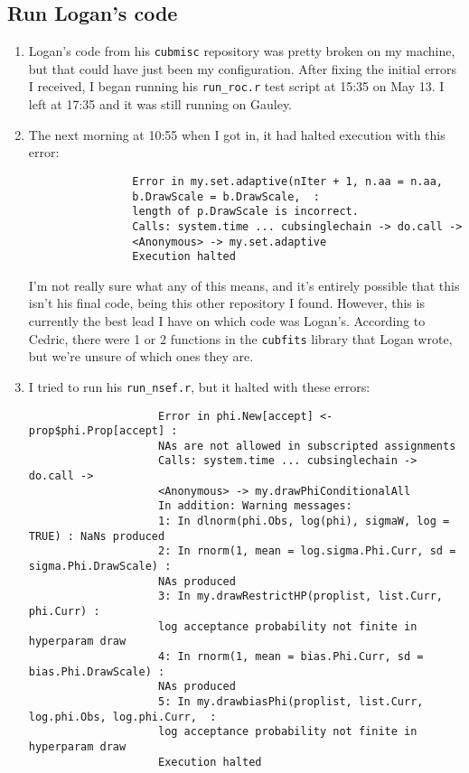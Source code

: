 \documentclass[12 pt]{article}
\begin{document}
		\subsection{Run Logan's code}
			\begin{enumerate}
				\item Logan's code from his \texttt{cubmisc} repository was pretty broken on my machine, but that could have just been my configuration. After fixing the initial errors I received, I began running his \texttt{run\_roc.r} test script at 15:35 on May 13. I left at 17:35 and it was still running on Gauley.
				\item The next morning at 10:55 when I got in, it had halted execution with this error:
				\begin{verbatim}
				Error in my.set.adaptive(nIter + 1, n.aa = n.aa, 
				b.DrawScale = b.DrawScale,  : 
				length of p.DrawScale is incorrect.
				Calls: system.time ... cubsinglechain -> do.call -> 
				<Anonymous> -> my.set.adaptive
				Execution halted
				\end{verbatim}
				
				I'm not really sure what any of this means, and it's entirely possible that this isn't his final code, being this other repository I found. However, this is currently the best lead I have on which code was Logan's. According to Cedric, there were 1 or 2 functions in the \texttt{cubfits} library that Logan wrote, but we're unsure of which ones they are.
				
				\item I tried to run his \texttt{run\_nsef.r}, but it halted with these errors:
				\begin{verbatim}
					Error in phi.New[accept] <- prop$phi.Prop[accept] : 
					NAs are not allowed in subscripted assignments
					Calls: system.time ... cubsinglechain -> do.call -> 
					<Anonymous> -> my.drawPhiConditionalAll
					In addition: Warning messages:
					1: In dlnorm(phi.Obs, log(phi), sigmaW, log = TRUE) : NaNs produced
					2: In rnorm(1, mean = log.sigma.Phi.Curr, sd = sigma.Phi.DrawScale) :
					NAs produced
					3: In my.drawRestrictHP(proplist, list.Curr, phi.Curr) :
					log acceptance probability not finite in hyperparam draw
					4: In rnorm(1, mean = bias.Phi.Curr, sd = bias.Phi.DrawScale) :
					NAs produced
					5: In my.drawbiasPhi(proplist, list.Curr, log.phi.Obs, log.phi.Curr,  :
					log acceptance probability not finite in hyperparam draw
					Execution halted
				\end{verbatim}
				

\end{enumerate}
\end{document}
